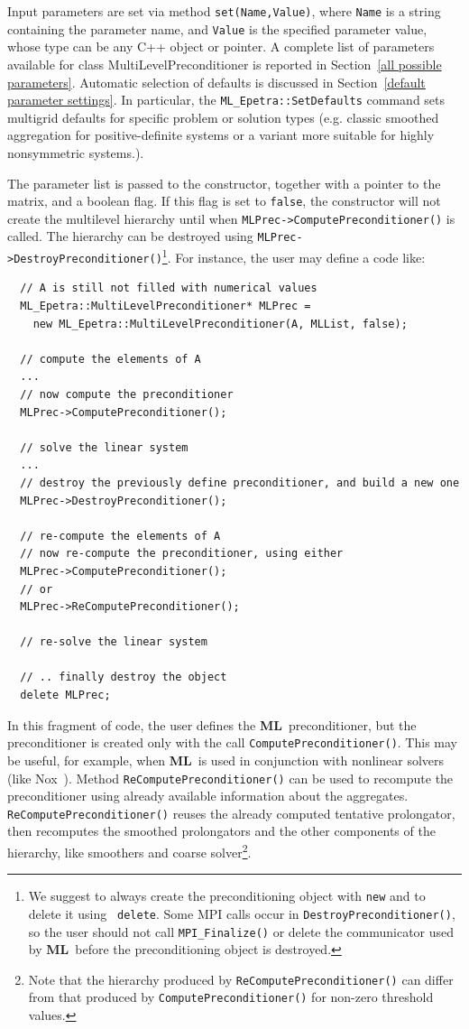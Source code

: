 \documentclass{article}[11pt]
\newcommand{\ML}     {{\bf ML}}
\begin{document}
Input parameters are set via method \verb!set(Name,Value)!, where
\verb!Name! is a string containing the parameter name, and \verb!Value! is the
specified parameter value, whose type can be any C++ object or pointer. 
A complete list of parameters available for class MultiLevelPreconditioner is
reported in Section~\ref{all possible parameters}.  Automatic selection of defaults 
is discussed in Section~\ref{default parameter settings}.
In particular, the \verb!ML_Epetra::SetDefaults! command sets multigrid defaults 
for specific problem or solution types (e.g. classic smoothed aggregation for 
positive-definite systems or a variant more suitable for highly nonsymmetric systems.).

The parameter list is passed to the constructor, together with a pointer
to the matrix, and a boolean flag.  If this flag is set to \verb!false!,
the constructor will not create the multilevel hierarchy until when
\verb!MLPrec->ComputePreconditioner()!  is called.  The hierarchy can be
destroyed using \verb!MLPrec->DestroyPreconditioner()!\footnote{We suggest to
  always create the preconditioning object with {\tt new} and to delete it using {\tt
    delete}. Some MPI calls occur in {\tt DestroyPreconditioner()}, so the user should
  not call {\tt MPI\_Finalize()} or delete the communicator used by \ML\
  before the preconditioning object is destroyed.}.
For instance, the
user may define a code like:
\begin{verbatim}
  // A is still not filled with numerical values
  ML_Epetra::MultiLevelPreconditioner* MLPrec = 
    new ML_Epetra::MultiLevelPreconditioner(A, MLList, false);
  
  // compute the elements of A
  ...
  // now compute the preconditioner
  MLPrec->ComputePreconditioner();

  // solve the linear system
  ...
  // destroy the previously define preconditioner, and build a new one
  MLPrec->DestroyPreconditioner();

  // re-compute the elements of A
  // now re-compute the preconditioner, using either
  MLPrec->ComputePreconditioner();
  // or
  MLPrec->ReComputePreconditioner();

  // re-solve the linear system

  // .. finally destroy the object
  delete MLPrec;
\end{verbatim}
In this fragment of code, the user defines the \ML\ preconditioner, but
the preconditioner is created only with the call \verb!ComputePreconditioner()!.
 This may
be useful, for example, when \ML\ is used in conjunction with
nonlinear solvers (like {\sc Nox}~\cite{NOX-home-page}). Method
\verb!ReComputePreconditioner()! can be used to recompute the preconditioner
using already available information about the aggregates.
\verb!ReComputePreconditioner()! reuses the already computed tentative
prolongator, then recomputes the smoothed prolongators and the other
components of the hierarchy, like smoothers and coarse solver\footnote{Note
  that the hierarchy produced by {\tt ReComputePreconditioner()} can 
  differ from that produced by {\tt ComputePreconditioner()} for
  non-zero threshold values.}. 
\end{document}

